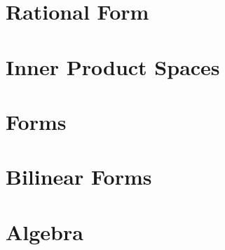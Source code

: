 \documentclass[11pt]{extarticle}
\begin{document}
\begin{multicols}{2}
   	   	
   	\section{Rational Form}
   	

	\section{Inner Product Spaces}
	\section{Forms}
	\section{Bilinear Forms}
	\section{Algebra}
\end{multicols}
\end{document}
